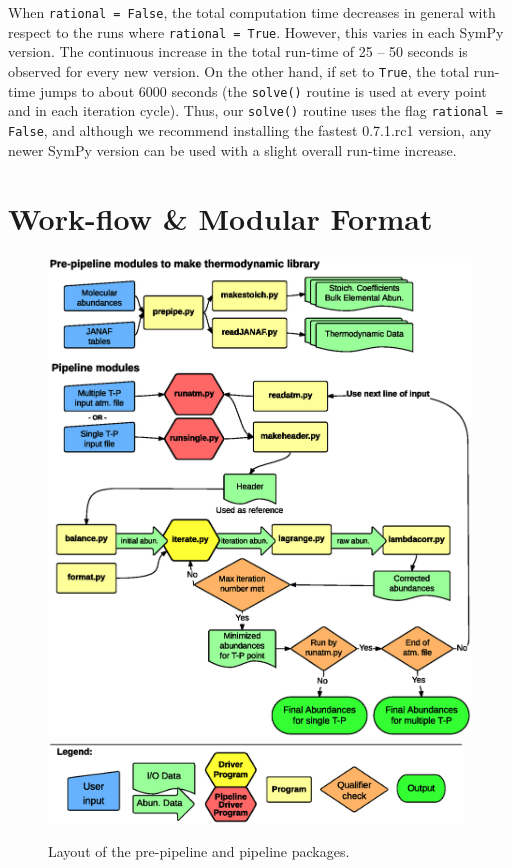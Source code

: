   When \texttt{rational = False}, the total computation time decreases
  in general with respect to the runs where \texttt{rational =
  True}. However, this varies in each SymPy version. The continuous
  increase in the total run-time of 25 -- 50 seconds is observed for
  every new version. On the other hand, if set to \texttt{True}, the
  total run-time jumps to about 6000 seconds (the \texttt{solve()}
  routine is used at every  point and in each iteration
  cycle). Thus, our \texttt{solve()} routine uses the
  flag \texttt{rational = False}, and although we recommend installing
  the fastest 0.7.1.rc1 version, any newer SymPy version can be used
  with a slight overall run-time increase.


\section{Work-flow \& Modular Format}
\label{flow}


\begin{figure}[!h]
    \centering
    \includegraphics[width=12.25cm, trim=22 100 27 110,
    clip=true]{figs/TEAFlow.ps}
    \includegraphics[width=11cm, trim=22 340 27 320,
    clip=true]{figs/LegFlow.ps}
\caption{Layout of the pre-pipeline and pipeline packages.}
\label{fig:TEAflow}
\end{figure}


